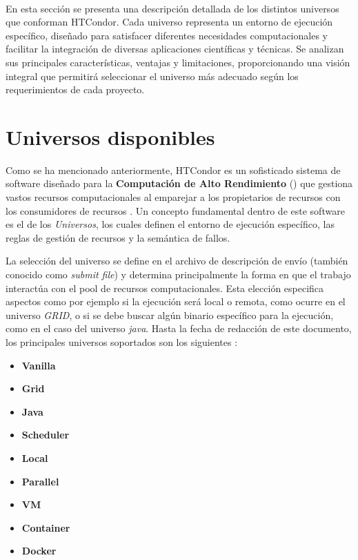\label{cap:caracterizacion-universos}
\mbox{}\\

En esta sección se presenta una descripción detallada de los distintos universos que conforman HTCondor. Cada universo representa un entorno de ejecución específico, diseñado para satisfacer diferentes necesidades computacionales y facilitar la integración de diversas aplicaciones científicas y técnicas. Se analizan sus principales características, ventajas y limitaciones, proporcionando una visión integral que permitirá seleccionar el universo más adecuado según los requerimientos de cada proyecto.



\section{Universos disponibles}

Como se ha mencionado anteriormente, HTCondor es un sofisticado sistema de software diseñado para la \textbf{Computación de Alto Rendimiento} (\HTC) que gestiona vastos recursos computacionales al emparejar a los propietarios de recursos con los consumidores de recursos \citep{HTCondor}. Un concepto fundamental dentro de este software es el de los \textit{Universos}, los cuales definen el entorno de ejecución específico, las reglas de gestión de recursos y la semántica de fallos.

La selección del universo se define en el archivo de descripción de envío (también conocido como \textit{submit file}) y determina principalmente la forma en que el trabajo interactúa con el pool de recursos computacionales. Esta elección especifica aspectos como por ejemplo si la ejecución será local o remota, como ocurre en el universo \textit{GRID}, o si se debe buscar algún binario específico para la ejecución, como en el caso del universo \textit{java}. Hasta la fecha de redacción de este documento, los principales universos soportados son los siguientes \citep{HTCondor-choosing-universe}:

\begin{itemize}
	\item \textbf{Vanilla}
	\item \textbf{Grid}
	\item \textbf{Java}
	\item \textbf{Scheduler}
	\item \textbf{Local}
	\item \textbf{Parallel}
	\item \textbf{VM}
	\item \textbf{Container}
	\item \textbf{Docker}
\end{itemize}

